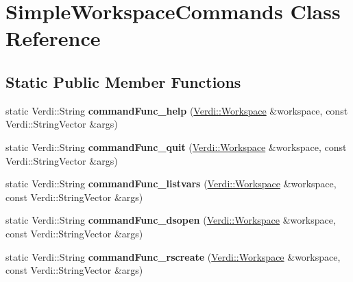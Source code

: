 \hypertarget{class_simple_workspace_commands}{\section{\-Simple\-Workspace\-Commands \-Class \-Reference}
\label{class_simple_workspace_commands}
}
\subsection*{\-Static \-Public \-Member \-Functions}
\begin{DoxyCompactItemize}
\item 
\hypertarget{class_simple_workspace_commands_a0608a0ab6628eaeb5a13c66dc534f8d2}{static \-Verdi\-::\-String {\bfseries command\-Func\-\_\-help} (\hyperlink{class_verdi_1_1_workspace}{\-Verdi\-::\-Workspace} \&workspace, const \-Verdi\-::\-String\-Vector \&args)}\label{class_simple_workspace_commands_a0608a0ab6628eaeb5a13c66dc534f8d2}

\item 
\hypertarget{class_simple_workspace_commands_a9db374030edcb453b48688350d15207b}{static \-Verdi\-::\-String {\bfseries command\-Func\-\_\-quit} (\hyperlink{class_verdi_1_1_workspace}{\-Verdi\-::\-Workspace} \&workspace, const \-Verdi\-::\-String\-Vector \&args)}\label{class_simple_workspace_commands_a9db374030edcb453b48688350d15207b}

\item 
\hypertarget{class_simple_workspace_commands_a9558110d9cc0b43063121b5f19357b50}{static \-Verdi\-::\-String {\bfseries command\-Func\-\_\-listvars} (\hyperlink{class_verdi_1_1_workspace}{\-Verdi\-::\-Workspace} \&workspace, const \-Verdi\-::\-String\-Vector \&args)}\label{class_simple_workspace_commands_a9558110d9cc0b43063121b5f19357b50}

\item 
\hypertarget{class_simple_workspace_commands_a28d7ce9d6575741d52d8b0aa307a3174}{static \-Verdi\-::\-String {\bfseries command\-Func\-\_\-dsopen} (\hyperlink{class_verdi_1_1_workspace}{\-Verdi\-::\-Workspace} \&workspace, const \-Verdi\-::\-String\-Vector \&args)}\label{class_simple_workspace_commands_a28d7ce9d6575741d52d8b0aa307a3174}

\item 
\hypertarget{class_simple_workspace_commands_a8bea78bba2c0de4fe0a1c961baa6517b}{static \-Verdi\-::\-String {\bfseries command\-Func\-\_\-rscreate} (\hyperlink{class_verdi_1_1_workspace}{\-Verdi\-::\-Workspace} \&workspace, const \-Verdi\-::\-String\-Vector \&args)}\label{class_simple_workspace_commands_a8bea78bba2c0de4fe0a1c961baa6517b}


\end{DoxyCompactItemize}
